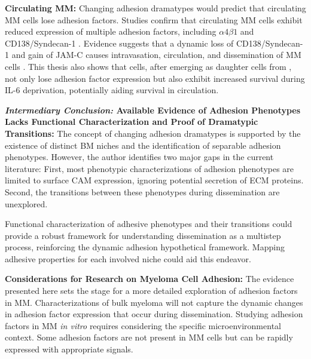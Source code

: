 \textbf{Circulating MM:}
Changing adhesion dramatypes would predict that circulating MM cells lose adhesion
factors. Studies confirm that  circulating
\ac{MM} cells exhibit reduced expression%
%
of multiple adhesion factors, including $\alpha4\beta1$ and CD138/Syndecan-1
\cite{paivaDetailedCharacterizationMultiple2013,
      paivaCompetitionClonalPlasma2011, akhmetzyanovaDynamicCD138Surface2020}.
Evidence suggests that a dynamic loss of CD138/Syndecan-1 and gain of JAM-C
causes intravasation, circulation, and dissemination of MM cells
\cite{akhmetzyanovaDynamicCD138Surface2020,
      brandlJunctionalAdhesionMolecule2022}. This thesis also shows that \nMAina
cells, after emerging as daughter cells from \MAina, not only lose adhesion
factor expression but also exhibit increased survival during IL-6 deprivation,
potentially aiding survival in circulation.


\textbf{\textit{Intermediary Conclusion:} Available Evidence of Adhesion
      Phenotypes Lacks Functional Characterization and Proof of Dramatypic
      Transitions:} The concept of changing adhesion dramatypes is supported by the
existence of distinct BM niches and the identification of separable adhesion
phenotypes. However, the author identifies two major gaps in the current
literature: First, most phenotypic characterizations of adhesion phenotypes are
limited to surface \ac{CAM} expression, ignoring potential secretion of \ac{ECM}
proteins. Second, the transitions between these phenotypes during dissemination
are unexplored.

Functional characterization of adhesive phenotypes  and their transitions could provide a robust framework for
understanding dissemination as a multistep process, reinforcing the dynamic
adhesion hypothetical framework. Mapping adhesive properties for each involved
niche could aid this endeavor.




\textbf{Considerations for Research on Myeloma Cell Adhesion:}
The evidence presented here sets the stage for a more detailed exploration of
adhesion factors in MM. Characterizations of bulk myeloma will not capture
the dynamic changes in adhesion factor expression that occur during dissemination.
Studying adhesion factors in MM \textit{in vitro} requires considering the
specific microenvironmental context. Some adhesion factors are not present in MM
cells but can be rapidly expressed with appropriate signals.

